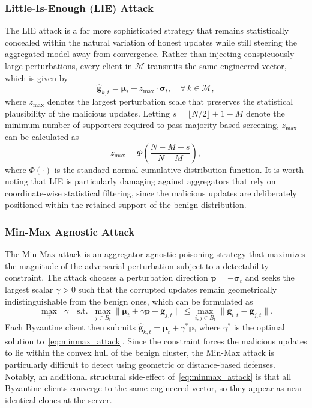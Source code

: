 \documentclass[journal]{IEEEtran}
\begin{document}
\subsubsection{Little-Is-Enough (LIE) Attack~\cite{baruch2019little}}
The LIE attack is a far more sophisticated strategy that remains statistically concealed within the natural variation of honest updates while still steering the aggregated model away from convergence. Rather than injecting conspicuously large perturbations, every client in $\mathcal{M}$ transmits the same engineered vector, which is given by
\begin{equation}
\hat{\mathbf{g}}_{k,t} = \boldsymbol{\mu}_t - z_{\max} \cdot \boldsymbol{\sigma}_t, \quad \forall\, k \in \mathcal{M},
\label{eq:lie_attack}
\end{equation}
where $z_{\max}$ denotes the largest perturbation scale that preserves the statistical plausibility of the malicious updates. Letting $s = \lfloor N/2 \rfloor + 1 - M$ denote the minimum number of supporters required to pass majority-based screening, $z_{\max}$ can be calculated as
\begin{equation}
z_{\max} = \Phi\left(\frac{N - M - s}{N - M}\right),
\label{eq:zmax}
\end{equation}
where $\Phi(\cdot)$ is the standard normal cumulative distribution function. It is worth noting that LIE is particularly damaging against aggregators that rely on coordinate-wise statistical filtering, since the malicious updates are deliberately positioned within the retained support of the benign distribution.

\subsubsection{Min-Max Agnostic Attack~\cite{shejwalkar2021manipulating}}
The Min-Max attack is an aggregator-agnostic poisoning strategy that maximizes the magnitude of the adversarial perturbation subject to a detectability constraint. The attack chooses a perturbation direction $\mathbf{p} = -\boldsymbol{\sigma}_t$ and seeks the largest scalar $\gamma > 0$ such that the corrupted updates remain geometrically indistinguishable from the benign ones, which can be formulated as
\begin{equation}
\max_{\gamma} \;\; \gamma \quad \text{s.t.} \;\; \max_{j \in B_t} \|\boldsymbol{\mu}_t + \gamma \mathbf{p} - \mathbf{g}_{j,t}\| \leq \max_{i,j \in B_t} \|\mathbf{g}_{i,t} - \mathbf{g}_{j,t}\|.
\label{eq:minmax_attack}
\end{equation}
Each Byzantine client then submits $\hat{\mathbf{g}}_{k,t} = \boldsymbol{\mu}_t + \gamma^* \mathbf{p}$, where $\gamma^*$ is the optimal solution to~\eqref{eq:minmax_attack}. Since the constraint forces the malicious updates to lie within the convex hull of the benign cluster, the Min-Max attack is particularly difficult to detect using geometric or distance-based defenses. Notably, an additional structural side-effect of~\eqref{eq:minmax_attack} is that all Byzantine clients converge to the same engineered vector, so they appear as near-identical clones at the server.
\end{document}
